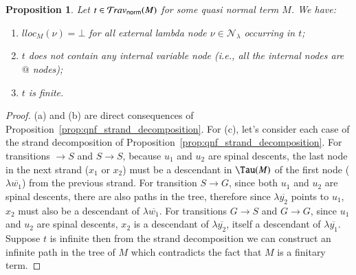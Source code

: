 \documentclass{elsarticle}
\makeatletter
\theoremstyle{plain}
\newtheorem{proposition}[theorem]{Proposition}
\theoremstyle{definition}
\newcommand\Nodes{\mathcal{N}}%
\newcommand\NodesLmd{\Nodes_\lambda}%
\newcommand{\normalizing}{{\sf norm}}
\newcommand{\travsetnorm}{\travset_\normalizing} %
\newcommand{\ctree}{\Tau} %
\renewcommand\ie{{\it i.e.\@\xspace}}
\makeatother
\begin{document}
\begin{proposition}
\label{prop:qnf_traversals_are_finite}
Let $t \in \travsetnorm(M)$ for some \emph{quasi normal} term $M$. We have:
\begin{enumerate}[label=(\alph*), nosep]
\item $lloc_M(\nu) = \bot$ for all external lambda node $\nu \in \NodesLmd$ occurring in $t$;
\item $t$ does not contain any internal variable node (\ie, all the internal nodes are $@$ nodes);
\item $t$ is finite.
\end{enumerate}
\end{proposition}
\begin{proof}
(a) and (b) are direct consequences of Proposition~\ref{prop:qnf_strand_decomposition}.
For (c), let's consider each case of the strand decomposition of Proposition~\ref{prop:qnf_strand_decomposition}. For transitions $\rightarrow S$ and $S \rightarrow S$, because $u_1$ and $u_2$ are spinal descents, the last node in the next strand ($x_1$ or $x_2$) must be a descendant
in $\ctree(M)$ of the first node ($\lambda\overline{w_1}$) from the previous strand.
For transition $S\rightarrow G$, since both $u_1$ and $u_2$ are spinal descents, there are also paths in the tree, therefore since $\lambda\overline{y_2}$ points to $u_1$, $x_2$ must also be a descendant of $\lambda\overline{w_1}$. For transitions $G \rightarrow S$ and $G \rightarrow G$, since $u_1$ and $u_2$ are spinal descents, $x_2$ is a descendant of $\lambda\overline{y_2}$, itself a descendant of $\lambda\overline{y_1}$.
Suppose $t$ is infinite then from the strand decomposition we can construct an infinite path in the tree of $M$ which contradicts the fact that $M$ is a finitary term.
\end{proof}
\end{document}
